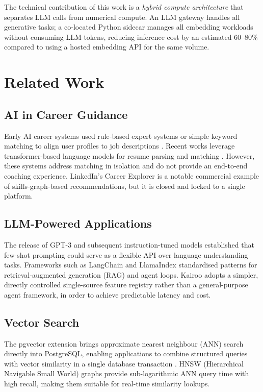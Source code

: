 \documentclass[conference]{IEEEtran}
\begin{document}
The technical contribution of this work is a \emph{hybrid compute architecture} that separates LLM calls from numerical compute. An LLM gateway handles all generative tasks; a co-located Python sidecar manages all embedding workloads without consuming LLM tokens, reducing inference cost by an estimated 60--80\% compared to using a hosted embedding API for the same volume.

\section{Related Work}

\subsection{AI in Career Guidance}

Early AI career systems used rule-based expert systems or simple keyword matching to align user profiles to job descriptions \cite{keim2007careerexpert}. Recent works leverage transformer-based language models for resume parsing and matching \cite{dave2018resumeparse, yang2022jobbert}. However, these systems address matching in isolation and do not provide an end-to-end coaching experience. LinkedIn's Career Explorer \cite{linkedin2021} is a notable commercial example of skills-graph-based recommendations, but it is closed and locked to a single platform.

\subsection{LLM-Powered Applications}

The release of GPT-3 \cite{brown2020gpt3} and subsequent instruction-tuned models established that few-shot prompting could serve as a flexible API over language understanding tasks. Frameworks such as LangChain \cite{langchain2023} and LlamaIndex \cite{llamaindex2023} standardised patterns for retrieval-augmented generation (RAG) and agent loops. Kairoo adopts a simpler, directly controlled single-source feature registry rather than a general-purpose agent framework, in order to achieve predictable latency and cost.

\subsection{Vector Search}

The pgvector extension \cite{pgvector2023} brings approximate nearest neighbour (ANN) search directly into PostgreSQL, enabling applications to combine structured queries with vector similarity in a single database transaction \cite{pgvector2023}. HNSW (Hierarchical Navigable Small World) graphs \cite{malkov2018hnsw} provide sub-logarithmic ANN query time with high recall, making them suitable for real-time similarity lookups.
\end{document}
